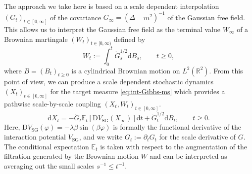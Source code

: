 \documentclass[11pt, a4paper]{scrartcl}
\numberwithin{equation}{section}
\theoremstyle{plain}
\theoremstyle{remark}
\newcommand{\assign}{:=}
\newcommand{\mathD}{\mathrm{D}}
\newcommand{\mathd}{\mathrm{d}}
\newcommand{\tmop}[1]{\ensuremath{\operatorname{#1}}}
\begin{document}
The approach we take here is based on a scale dependent interpolation
$(G_t)_{t \in [0, \infty]}$ of the covariance $G_{\infty} = (\Delta - m^2)^{-
			1}$ of the Gaussian free field. This allows us to interpret the Gaussian free
field as the terminal value $W_{\infty}$ of a Brownian martingale $(W_t)_{t
	\in [0, \infty)}$ defined by
\begin{equation}
	W_t \assign \int_0^t \dot{G}_s^{1 / 2} \mathd B_s, \qquad t \geqslant 0,
	\label{eq:GFF}
\end{equation}
where $B = (B_t)_{t \geqslant 0}$ is a cylindrical Brownian motion on $L^2
	(\mathbb{R}^2)$. From this point of view, we can produce a scale dependent
stochastic dynamics $(X_t)_{t \in [0, \infty]}$ for the target measure
\eqref{eq:int-Gibbs-ms} which provides a pathwise
scale-by-scale coupling $(X_t, W_t)_{t \in [0, \infty]}$.
\begin{equation}
	\mathd X_t = - \dot{G}_t \mathbb{E}_t [\mathD V_{\tmop{SG}} (X_{\infty})]
	\mathd t + \dot{G}_t^{1 / 2} \mathd B_t, \qquad t \geqslant 0.
	\label{eq:fbsde-intro}
\end{equation}
Here, $\mathD V_{\tmop{SG}} (\varphi) = - \lambda \beta \sin (\beta \varphi)$ is
formally the functional derivative of the interaction potential
$V_{\tmop{SG}}$, and we write $\dot{G}_t \assign \partial_t G_t$ for the scale
derivative of $G$. The conditional expectation $\mathbb E_t$ is taken with respect to the
augmentation of the filtration generated by the Brownian motion $W$ and can
be interpreted as averaging out the small scales $s^{-1}\leqslant t^{-1}$.
\end{document}
